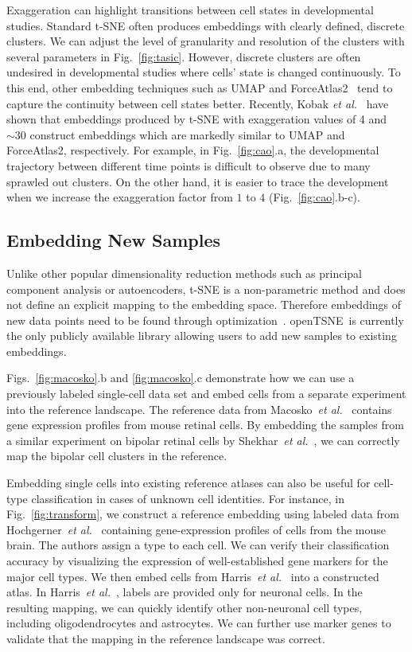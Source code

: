 \documentclass[twocolumn]{bmcart}
\newcommand{\opentsne}{\textsf{openTSNE}}
\begin{document}
Exaggeration can highlight transitions between cell states in developmental studies. Standard t-SNE often produces embeddings with clearly defined, discrete clusters. We can adjust the level of granularity and resolution of the clusters with several parameters in Fig.~\ref{fig:tasic}. However, discrete clusters are often undesired in developmental studies where cells' state is changed continuously. To this end, other embedding techniques such as UMAP and ForceAtlas2~\cite{jacomy2014forceatlas2} tend to capture the continuity between cell states better. Recently, Kobak \textit{et al.}~\cite{TODO} have shown that embeddings produced by t-SNE with exaggeration values of 4 and $\sim30$ construct embeddings which are markedly similar to UMAP and ForceAtlas2, respectively. For example, in Fig.~\ref{fig:cao}.a, the developmental trajectory between different time points is difficult to observe due to many sprawled out clusters. On the other hand, it is easier to trace the development when we increase the exaggeration factor from $1$ to $4$ (Fig.~\ref{fig:cao}.b-c). 

\subsection*{Embedding New Samples}

Unlike other popular dimensionality reduction methods such as principal
component analysis or autoencoders, t-SNE is a non-parametric method and does not define an explicit mapping to the embedding space. Therefore embeddings of new data points need to be found through optimization~\cite{policar2019embedding}. \opentsne\ is currently the only publicly available library allowing users to add new samples to existing embeddings.

Figs.~\ref{fig:macosko}.b and \ref{fig:macosko}.c demonstrate how we can use a previously labeled single-cell data set and embed cells from a separate experiment into the reference landscape. The reference data from Macosko~\textit{et al.}~\cite{macosko2015highly} contains gene expression profiles from mouse retinal cells. By embedding the samples from a similar experiment on bipolar retinal cells by Shekhar~\textit{et al.}~\cite{shekhar2016comprehensive}, we can correctly map the bipolar cell clusters in the reference.

Embedding single cells into existing reference atlases can also be useful for cell-type classification in cases of unknown cell identities. For instance, in Fig.~\ref{fig:transform}, we construct a reference embedding using labeled data from Hochgerner~\textit{et al.}~\cite{hochgerner2018conserved} containing gene-expression profiles of cells from the mouse brain. The authors assign a type to each cell. We can verify their classification accuracy by visualizing the expression of well-established gene markers for the major cell types. We then embed cells from Harris~\textit{et al.}~\cite{harris2018classes} into a constructed atlas. In Harris~\textit{et al.}~, labels are provided only for neuronal cells. In the resulting mapping, we can quickly identify other non-neuronal cell types, including oligodendrocytes and astrocytes. We can further use marker genes to validate that the mapping in the reference landscape was correct. 
\end{document}
